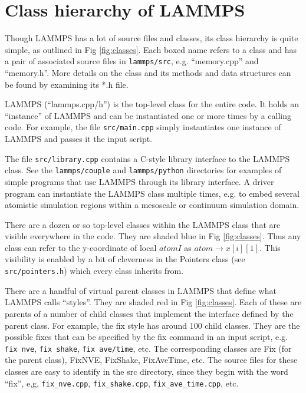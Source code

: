 \documentclass{article}
\newcommand{\path}[1]{{\color{gray}\texttt{#1}}}
\newcommand{\code}[1]{{\color{cadetblue}\texttt{#1}}}
\begin{document}
\pagebreak
\section{Class hierarchy of LAMMPS}

Though LAMMPS has a lot of source files and classes, its class
hierarchy is quite simple, as outlined in Fig \ref{fig:classes}.  Each
boxed name refers to a class and has a pair of associated source files
in \path{lammps/src}, e.g. ``memory.cpp'' and ``memory.h''.  More details on the
class and its methods and data structures can be found by examining
its *.h file.

LAMMPS (``lammps.cpp/h'') is the top-level class for the entire code.  It
holds an ``instance'' of LAMMPS and can be instantiated one or more
times by a calling code.  For example, the file \path{src/main.cpp} simply
instantiates one instance of LAMMPS and passes it the input script.

The file \path{src/library.cpp} contains a C-style library interface to the
LAMMPS class.  See the \path{lammps/couple} and \path{lammps/python} directories for
examples of simple programs that use LAMMPS through its library
interface.  A driver program can instantiate the LAMMPS class multiple
times, e.g. to embed several atomistic simulation regions within a
mesoscale or continuum simulation domain.

There are a dozen or so top-level classes within the LAMMPS class that
are visible everywhere in the code.  They are shaded blue in Fig
\ref{fig:classes}.  Thus any class can refer to the y-coordinate of
local $atom I$ as $atom \rightarrow x[i][1]$.  This visibility is
enabled by a bit of cleverness in the Pointers class (see
\path{src/pointers.h}) which every class inherits from.

There are a handful of virtual parent classes in LAMMPS that define what LAMMPS
calls ``styles''. They are shaded red in Fig \ref{fig:classes}. Each of these
are parents of a number of child classes that implement the interface defined by
the parent class. For example, the fix style has around 100 child classes. They
are the possible fixes that can be specified by the fix command in an input
script, e.g. \code{fix nve}, \code{fix shake}, \code{fix ave/time}, etc. The
corresponding classes are Fix (for the parent class), FixNVE, FixShake,
FixAveTime, etc. The source files for these classes are easy to identify in the
src directory, since they begin with the word ``fix'', e,g, \path{fix\_nve.cpp},
\path{fix\_shake.cpp}, \path{fix\_ave\_time.cpp}, etc.
\end{document}
